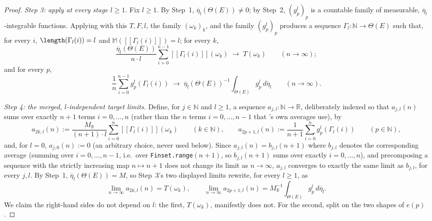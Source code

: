 \begin{proof}
  \emph{Step 3: apply  at every stage $l\ge1$.} Fix $l\ge1$. By Step~1,
  $\overline\eta_l(\Theta(E)) \ne 0$; by Step~2, $(g^l_p)_p$ is a countable family of measurable,
  $\overline\eta_l$-integrable functions. Applying  with this $T,F,l$, the
  family $(\omega_k)_k$, and the family $(g^l_p)_p$ produces a sequence $\Gamma_l\colon
  \mathbb{N}\to\Theta(E)$ such that, for every $i$, $\length(\Gamma_l(i))=l$ and
  $\mathbb{M}([[\Gamma_l(i)]])=l$; for every $k$,
  \[
    \frac{\overline\eta_l(\Theta(E))}{n\cdot l}\sum_{i=0}^{n-1}[[\Gamma_l(i)]](\omega_k)
    \;\longrightarrow\; T(\omega_k)
    \qquad(n\to\infty)
    ;
  \]
  and for every $p$,
  \[
    \frac{1}{n}\sum_{i=0}^{n-1} g^l_p(\Gamma_l(i))
    \;\longrightarrow\; \overline\eta_l(\Theta(E))^{-1}\int_{\Theta(E)} g^l_p\,d\overline\eta_l
    \qquad(n\to\infty)
    .
  \]

  \emph{Step 4: the merged, $l$-independent target limits.} Define, for $j\in\mathbb{N}$ and
  $l\ge1$, a sequence $a_{j,l}\colon\mathbb{N}\to\mathbb{R}$, deliberately indexed so that
  $a_{j,l}(n)$ sums over exactly $n+1$ terms $i=0,\dots,n$ (rather than the $n$ terms
  $i=0,\dots,n-1$ that 's own averages use), by
  \[
    a_{2k,l}(n) := \frac{M_{\mathbb R}}{(n+1)\cdot l}\sum_{i=0}^{n}[[\Gamma_l(i)]](\omega_k)
    \qquad(k\in\mathbb{N})
    ,
    \qquad
    a_{2p+1,l}(n) := \frac{1}{n+1}\sum_{i=0}^{n} g^l_p(\Gamma_l(i))
    \qquad(p\in\mathbb{N})
    ,
  \]
  and, for $l=0$, $a_{j,0}(n):=0$ (an arbitrary choice, never used below). Since
  $a_{j,l}(n) = b_{j,l}(n+1)$ where $b_{j,l}$ denotes the corresponding 
  average (summing over $i=0,\dots,n-1$, i.e.\ over \texttt{Finset.range}$(n+1)$, so $b_{j,l}(n+1)$
  sums over exactly $i=0,\dots,n$), and precomposing a sequence with the strictly increasing map
  $n\mapsto n+1$ does not change its limit as $n\to\infty$, $a_{j,l}$ converges to exactly the same
  limit as $b_{j,l}$, for every $j,l$. By Step~1,
  $\overline\eta_l(\Theta(E)) = M$, so Step~3's two displayed limits rewrite, for every $l\ge1$, as
  \[
    \lim_{n\to\infty} a_{2k,l}(n) = T(\omega_k)
    ,
    \qquad
    \lim_{n\to\infty} a_{2p+1,l}(n) = M_{\mathbb R}^{-1}\int_{\Theta(E)} g^l_p\,d\overline\eta_l
    .
  \]
  We claim the right-hand sides do not depend on $l$: the first, $T(\omega_k)$, manifestly does
  not. For the second, split on the two shapes of $e(p)$.


\end{proof}
